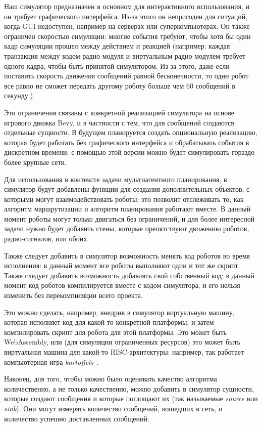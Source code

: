 \documentclass[%
]{report}
\begin{document}
Наш симулятор предназначен в основном для интерактивного использования,
и он требует графического интерфейса.
Из-за этого он непригоден для ситуаций, когда GUI недоступен,
например на серверах или суперкомпьютерах.
Он также ограничен скоростью симуляции:
многие события требуют, чтобы хотя бы один кадр симуляции прошел
между действием и реакцией
(например: каждая транзакция между кодом радио-модуля
и виртуальным радио-модулем
требует одного кадра,
чтобы быть принятой симулятором.
Из-за этого,
даже если поставить скорость движения сообщений равной бесконечности,
то один робот все равно не сможет передать другому роботу
больше чем 60 сообщений в секунду.)

Эти ограничения связаны с конкретной реализацией симулятора
на основе игрового движка Bevy,
и в частности с тем, что для сообщений создаются отдельные сущности.
В будущем планируется создать опциональную реализацию,
которая будет работать без графического интерфейса
и обрабатывать события в дискретном времени:
с помощью этой версии можно будет симулировать гораздо более крупные сети.

Для использования в контексте задачи
мультиагентного планирования,
в симулятор будут добавлены
функции для создания дополнительных объектов,
с которыми могут взаимодействовать роботы:
это позволит отслеживать то,
как алгоритм маршрутизации и алгоритм планирования работают вместе.
В данный момент роботы могут только двигаться без ограничений,
и для более интересной задачи нужно будет добавить стены, которые препятствуют движению роботов,
радио-сигналов, или обоих.

Также следует добавить в симулятор
возможность менять код роботов во время исполнения:
в данный момент все роботы выполняют один и тот же скрипт.
Также следует добавить возможность добавлять свой собственный код:
в данный момент код роботов компилируется вместе с кодом симулятора,
и его нельзя изменить без перекомпиляции всего проекта.

Это можно сделать, например,
внедрив в симулятор виртуальную машину,
которая исполняет код для какой-то конкретной платформы,
и затем компилировать скрипт для робота для этой платформы.
Это может быть WebAssembly,
или (для симуляции ограниченных ресурсов)
это может быть виртуальная машина для какой-то RISC-архитектуры:
например, так работает компьютерная игра \emph{kartoffels}~\cite{kartoffels}.

Наконец, для того, чтобы можно было оценивать качество алгоритма
количественно, а не только качественно,
можно добавить в симулятор
сущности,
которые создают сообщения
и которые поглощают их
(так называемые \emph{source} или \emph{sink}).
Они могут измерять количество сообщений,
вошедших в сеть,
и количество успешно доставленных сообщений.
\end{document}
